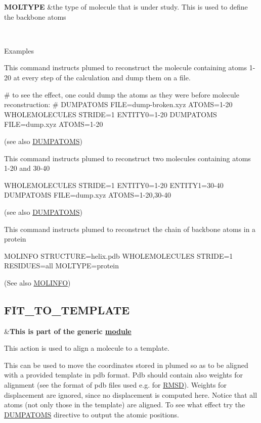 \begin{TabularC}{2}
\hline
{\bfseries  M\+O\+L\+T\+Y\+P\+E } &the type of molecule that is under study. This is used to define the backbone atoms  

\\
\end{TabularC}


\begin{DoxyParagraph}{Examples}

\end{DoxyParagraph}
This command instructs plumed to reconstruct the molecule containing atoms 1-\/20 at every step of the calculation and dump them on a file.

\begin{DoxyVerb}# to see the effect, one could dump the atoms as they were before molecule reconstruction:
# DUMPATOMS FILE=dump-broken.xyz ATOMS=1-20
WHOLEMOLECULES STRIDE=1 ENTITY0=1-20
DUMPATOMS FILE=dump.xyz ATOMS=1-20
\end{DoxyVerb}
 (see also \hyperlink{DUMPATOMS}{D\+U\+M\+P\+A\+T\+O\+M\+S})

This command instructs plumed to reconstruct two molecules containing atoms 1-\/20 and 30-\/40

\begin{DoxyVerb}WHOLEMOLECULES STRIDE=1 ENTITY0=1-20 ENTITY1=30-40
DUMPATOMS FILE=dump.xyz ATOMS=1-20,30-40
\end{DoxyVerb}
 (see also \hyperlink{DUMPATOMS}{D\+U\+M\+P\+A\+T\+O\+M\+S})

This command instructs plumed to reconstruct the chain of backbone atoms in a protein

\begin{DoxyVerb}MOLINFO STRUCTURE=helix.pdb
WHOLEMOLECULES STRIDE=1 RESIDUES=all MOLTYPE=protein 
\end{DoxyVerb}
 (See also \hyperlink{MOLINFO}{M\+O\+L\+I\+N\+F\+O}) \hypertarget{FIT_TO_TEMPLATE}{}\subsection{F\+I\+T\+\_\+\+T\+O\+\_\+\+T\+E\+M\+P\+L\+A\+T\+E}\label{FIT_TO_TEMPLATE}
\begin{TabularC}{2}
\hline
&{\bfseries  This is part of the generic \hyperlink{mymodules}{module }}   \\
\end{TabularC}
This action is used to align a molecule to a template.

This can be used to move the coordinates stored in plumed so as to be aligned with a provided template in pdb format. Pdb should contain also weights for alignment (see the format of pdb files used e.\+g. for \hyperlink{RMSD}{R\+M\+S\+D}). Weights for displacement are ignored, since no displacement is computed here. Notice that all atoms (not only those in the template) are aligned. To see what effect try the \hyperlink{DUMPATOMS}{D\+U\+M\+P\+A\+T\+O\+M\+S} directive to output the atomic positions.

